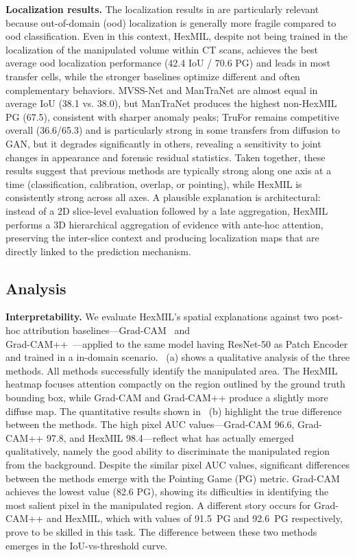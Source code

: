 \documentclass[sigconf, screen, review, anonymous]{acmart}
\begin{document}
\smallskip
\noindent\textbf{Localization results.}
The localization results in  are particularly relevant because out-of-domain (ood) localization is generally more fragile compared to ood classification. Even in this context, HexMIL, despite not being trained in the localization of the manipulated volume within CT scans, achieves the best average ood localization performance (42.4 IoU / 70.6 PG) and leads in most transfer cells, while the stronger baselines optimize different and often complementary behaviors. MVSS-Net and ManTraNet are almost equal in average IoU (38.1 vs. 38.0), but ManTraNet produces the highest non-HexMIL PG (67.5), consistent with sharper anomaly peaks; TruFor remains competitive overall (36.6/65.3) and is particularly strong in some transfers from diffusion to GAN, but it degrades significantly in others, revealing a sensitivity to joint changes in appearance and forensic residual statistics. Taken together, these results suggest that previous methods are typically strong along one axis at a time (classification, calibration, overlap, or pointing), while HexMIL is consistently strong across all axes. A plausible explanation is architectural: instead of a 2D slice-level evaluation followed by a late aggregation, HexMIL performs a 3D hierarchical aggregation of evidence with ante-hoc attention, preserving the inter-slice context and producing localization maps that are directly linked to the prediction mechanism.

\subsection{Analysis}


\noindent\textbf{Interpretability.}
We evaluate HexMIL's spatial explanations against two post-hoc attribution baselines---Grad-CAM~\cite{selvaraju2017grad} and \\Grad-CAM++~\cite{chattopadhay2018grad}---applied to the same model having ResNet-50 as Patch Encoder and trained in a in-domain scenario. ~(a) shows a qualitative analysis of the three methods. All methods successfully identify the manipulated area. The HexMIL heatmap focuses attention compactly on the region outlined by the ground truth bounding box, while Grad-CAM and Grad-CAM++ produce a slightly more diffuse map. The quantitative results shown in ~(b) highlight the true difference between the methods. The high pixel AUC values—Grad-CAM 96.6, Grad-CAM++ 97.8, and HexMIL 98.4—reflect what has actually emerged qualitatively, namely the good ability to discriminate the manipulated region from the background. Despite the similar pixel AUC values, significant differences between the methods emerge with the Pointing Game (PG) metric. Grad-CAM achieves the lowest value (82.6 PG), showing its difficulties in identifying the most salient pixel in the manipulated region. A different story occurs for Grad-CAM++ and HexMIL, which with values of 91.5~PG and 92.6~PG respectively, prove to be skilled in this task. The difference between these two methods emerges in the IoU-vs-threshold curve.
\end{document}
